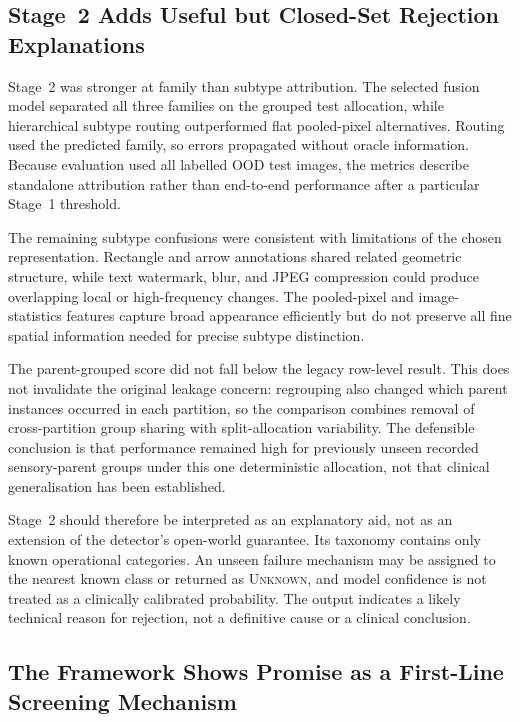 \documentclass[fleqn,12pt]{olplainarticle}
\begin{document}
\subsection{Stage~2 Adds Useful but Closed-Set Rejection Explanations}
\label{subsec:discussion_stage2}

Stage~2 was stronger at family than subtype attribution. The selected fusion model separated all three families on the grouped test allocation, while hierarchical subtype routing outperformed flat pooled-pixel alternatives. Routing used the predicted family, so errors propagated without oracle information. Because evaluation used all labelled OOD test images, the metrics describe standalone attribution rather than end-to-end performance after a particular Stage~1 threshold.

The remaining subtype confusions were consistent with limitations of the
chosen representation. Rectangle and arrow annotations shared related
geometric structure, while text watermark, blur, and JPEG compression could
produce overlapping local or high-frequency changes. The pooled-pixel and
image-statistics features capture broad appearance efficiently but do not
preserve all fine spatial information needed for precise subtype distinction.

The parent-grouped score did not fall below the legacy row-level result. This
does not invalidate the original leakage concern: regrouping also changed
which parent instances occurred in each partition, so the comparison combines
removal of cross-partition group sharing with split-allocation variability.
The defensible conclusion is that performance remained high for previously
unseen recorded sensory-parent groups under this one deterministic allocation,
not that clinical generalisation has been established.

Stage~2 should therefore be interpreted as an explanatory aid, not as an
extension of the detector's open-world guarantee. Its taxonomy contains only
known operational categories. An unseen failure mechanism may be assigned to
the nearest known class or returned as \textsc{Unknown}, and model confidence
is not treated as a clinically calibrated probability. The output indicates a
likely technical reason for rejection, not a definitive cause or a clinical
conclusion.

\subsection{The Framework Shows Promise as a First-Line Screening Mechanism}
\label{subsec:discussion_clinical_implications}
\end{document}

